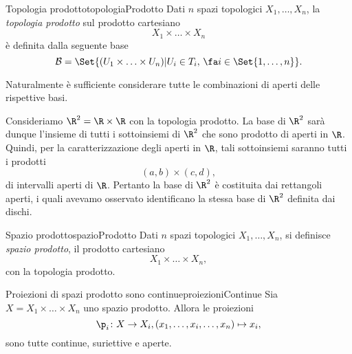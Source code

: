 \begin{defn}{Topologia prodotto}{topologiaProdotto}
	Dati \(n\) spazi topologici \(X_1, \ldots, X_n\), la \emph{topologia prodotto} sul prodotto cartesiano
	\[
		X_1 \times \ldots \times X_n
	\]
	è definita dalla seguente base
	\[
		\mathcal{B}=\Set{(U_1 \times \ldots \times U_n) | U_i\in T_i,\,\fa i\in\Set{1, \ldots, n}}.
	\]
\end{defn}

\begin{oss}
	Naturalmente è sufficiente considerare tutte le combinazioni di aperti delle rispettive basi.
\end{oss}

\begin{ese}
	Consideriamo \(\R^2=\R \times \R\) con la topologia prodotto. La base di \(\R^2\) sarà dunque l'insieme di tutti i sottoinsiemi di \(\R^2\) che sono prodotto di aperti in \(\R\).
	Quindi, per la caratterizzazione degli aperti in \(\R\), tali sottoinsiemi saranno tutti i prodotti
	\[
		(a,b) \times (c,d),
	\]
	di intervalli aperti di \(\R\).
	Pertanto la base di \(\R^2\) è costituita dai rettangoli aperti, i quali avevamo osservato identificano la stessa base di \(\R^2\) definita dai dischi.
\end{ese}

\begin{defn}{Spazio prodotto}{spazioProdotto}
	Dati \(n\) spazi topologici \(X_1, \ldots, X_n\), si definisce \emph{spazio prodotto}, il prodotto cartesiano
	\[
		X_1 \times \ldots \times X_n,
	\]
	con la topologia prodotto.
\end{defn}

\begin{prop}{Proiezioni di spazi prodotto sono continue}{proiezioniContinue}
	Sia \(X = X_1 \times \ldots \times X_n\) uno spazio prodotto.
	Allora le proiezioni
	\[
		\p_i \colon X \to X_i, (x_1, \ldots, x_i, \ldots, x_n)\mapsto x_i,
	\]
	sono tutte continue, suriettive e aperte.
\end{prop}

